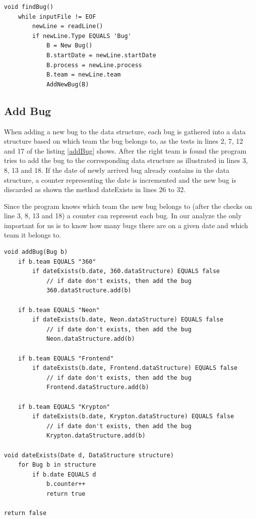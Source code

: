 \documentclass[UKenglish]{ifimaster}  %
\begin{document}
\begin{lstlisting}[caption=Pseudocode example of how bugs are found, label=findBug]
void findBug()
	while inputFile != EOF
		newLine = readLine()
		if newLine.Type EQUALS 'Bug'
			B = New Bug()
			B.startDate = newLine.startDate
			B.process = newLine.process
			B.team = newLine.team 
			AddNewBug(B)
 \end{lstlisting}

\subsection{Add Bug}
\label{addBugS}
When adding a new bug to the data structure, each bug is gathered into a data structure based on which team the bug belongs to, as the tests in lines 2, 7, 12 and 17 of the listing \ref{addBug} shows. After the right team is found the program tries to add the bug to the corresponding data structure as illustrated in lines 3, 8, 13 and 18. If the date of newly arrived bug already contains in the data structure, a counter representing the date is incremented and the new bug is discarded as shown the method dateExists in lines 26 to 32. 

Since the program knows which team the new bug belongs to (after the checks on line 3, 8, 13 and 18) a counter can represent each bug. In our analyze the only important for us is to know how many bugs there are on a given date and which team it belongs to.  
\newpage
\begin{lstlisting}[caption=Pseudocode example of how bugs are added, label=addBug]
void addBug(Bug b)
	if b.team EQUALS "360"
		if dateExists(b.date, 360.dataStructure) EQUALS false
			// if date don't exists, then add the bug
			360.dataStructure.add(b)
			
	if b.team EQUALS "Neon"
		if dateExists(b.date, Neon.dataStructure) EQUALS false
			// if date don't exists, then add the bug
			Neon.dataStructure.add(b)
			
	if b.team EQUALS "Frontend"
		if dateExists(b.date, Frontend.dataStructure) EQUALS false 
			// if date don't exists, then add the bug
			Frontend.dataStructure.add(b)
			
	if b.team EQUALS "Krypton"
		if dateExists(b.date, Krypton.dataStructure) EQUALS false
			// if date don't exists, then add the bug
			Krypton.dataStructure.add(b)
		
void dateExists(Date d, DataStructure structure)
	for Bug b in structure
		if b.date EQUALS d
			b.counter++
			return true
	
return false	
 \end{lstlisting}
 
\end{document}
